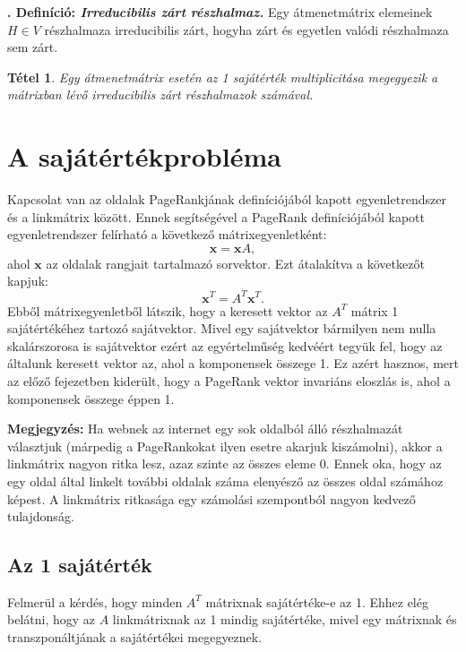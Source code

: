 \documentclass[12pt,a4paper]{article}
\newcounter{definicioszam}
\newenvironment{definicio}[1]
{{\medskip}\noindent \stepcounter{definicioszam}
{\bfseries{\thedefinicioszam. Definíció: \textit{#1.}}}}{\bigskip }
\newcommand{\bx}{\mathbf{x}}
\newtheorem{tetel}{Tétel}
\begin{document}
\begin{definicio}{Irreducibilis zárt részhalmaz}
	Egy átmenetmátrix elemeinek $H \in V$ részhalmaza irreducibilis zárt, hogyha zárt és egyetlen valódi részhalmaza sem zárt.
\end{definicio}

\begin{tetel}
	Egy átmenetmátrix esetén az 1 sajátérték multiplicitása megegyezik a mátrixban lévő irreducibilis zárt részhalmazok számával.
\end{tetel}

\section{A sajátértékprobléma}

Kapcsolat van az oldalak PageRankjának definíciójából kapott egyenletrendszer és a linkmátrix között. Ennek segítségével a PageRank definíciójából kapott egyenletrendszer felírható a következő mátrixegyenletként:
\[ 
\bx = \bx A, 
\]
ahol $\bx$ az oldalak rangjait tartalmazó sorvektor. Ezt átalakítva a következőt kapjuk:
\[
\bx^T = A^T \bx^T. 
\]
Ebből mátrixegyenletből látszik, hogy a keresett vektor az $A^T$ mátrix 1 sajátértékéhez 
tartozó sajátvektor. Mivel egy sajátvektor bármilyen nem nulla skalárszorosa is 
sajátvektor ezért az egyértelműség kedvéért tegyük fel, hogy az általunk keresett vektor 
az, ahol a komponensek összege 1. Ez azért hasznos, mert az előző fejezetben kiderült, 
hogy a PageRank vektor invariáns eloszlás is, ahol a komponensek összege éppen 1.

\vspace{0.1cm}
\textbf{Megjegyzés:} Ha webnek az internet egy sok oldalból álló részhalmazát választjuk (márpedig a PageRankokat ilyen esetre akarjuk kiszámolni), akkor a linkmátrix nagyon ritka lesz, azaz szinte az összes eleme 0. Ennek oka, hogy az egy oldal által linkelt további oldalak száma elenyésző az összes oldal számához képest. A linkmátrix ritkasága egy számolási szempontból nagyon kedvező tulajdonság. 

\subsection{Az 1 sajátérték}\label{egy_sajatertek}

Felmerül a kérdés, hogy minden $A^T$ mátrixnak sajátértéke-e az 1. Ehhez elég belátni, hogy az $A$ linkmátrixnak az 1 mindig sajátértéke, mivel egy mátrixnak és transzponáltjának a sajátértékei megegyeznek.
\end{document}

